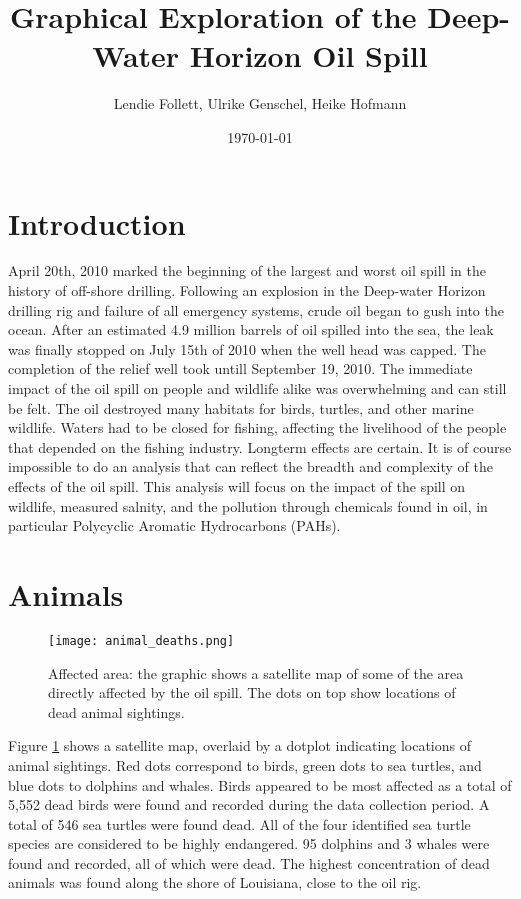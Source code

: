 \documentclass[11pt]{article}
\title{Graphical Exploration of the Deep-Water Horizon Oil Spill}
\author{Lendie Follett, Ulrike Genschel, Heike Hofmann}
\date{\today}                                           %
\begin{document}
\maketitle
\begin{abstract}
\end{abstract}
\section{Introduction}
April 20th, 2010 marked the beginning of the largest and worst oil spill in the history of off-shore drilling.  Following an explosion in the Deep-water Horizon drilling rig and failure of all emergency systems, crude oil began to gush into the ocean.  After an estimated 4.9 million barrels of oil spilled into the sea, the leak was finally stopped on July 15th of 2010 when the well head was capped.  The completion of the relief well took untill September 19, 2010.  The immediate impact of the oil spill on people and wildlife alike was overwhelming and can still be felt.  The oil destroyed many habitats for birds, turtles, and other marine wildlife.  Waters had to be closed for fishing, affecting the livelihood of the people that depended on the fishing industry.  Longterm effects are certain.  It is of course impossible to do an analysis that can reflect the breadth and complexity of the effects of the oil spill.  This analysis will focus on the impact of the spill on wildlife, measured salnity, and the pollution through chemicals found in oil, in particular Polycyclic Aromatic Hydrocarbons (PAHs). 
\section{Animals}

\begin{figure}[htbp] %
   \centering
   \texttt{[image: animal\_deaths.png]} 
   \caption{Affected area: the graphic shows a satellite map of some of the area directly affected by the oil spill. The dots on top show locations of dead animal sightings. }
   \label{deaths}
\end{figure}
Figure \ref{deaths} shows a satellite map, overlaid by a dotplot indicating locations of animal sightings. Red dots correspond to birds, green dots to sea turtles, and blue dots to dolphins and whales.  Birds appeared to be most affected as a total of 5,552 dead birds were found and recorded during the data collection period.  A total of 546 sea turtles were found dead.  All of the four identified sea turtle species are considered to be highly endangered.  95 dolphins and 3 whales were found and recorded, all of which were dead. The highest concentration of dead animals was found along the shore of Louisiana, close to the oil rig.  
\end{document}
